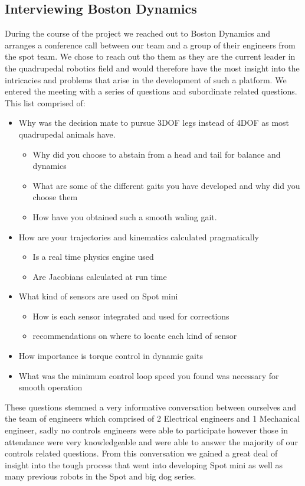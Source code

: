     \subsection{Interviewing Boston Dynamics}
        During the course of the project we reached out to Boston Dynamics and arranges a conference call between our team and a group of their engineers from the spot team. We chose to reach out tho them as they are the current leader in the quadrupedal robotics field and would therefore have the most insight into the intricacies and problems that arise in the development of such a platform. We entered the meeting with a series of questions and subordinate related questions. This list comprised of:
        \begin{itemize}
            \item Why was the decision mate to pursue 3DOF legs instead of 4DOF as most quadrupedal animals have. 
            \begin{itemize}
                \item Why did you choose to abstain from a head and tail for balance and dynamics
                \item What are some of the different gaits you have developed and why did you choose them
                \item How have you obtained such a smooth waling gait.
            \end{itemize}
            \item How are your trajectories and kinematics calculated pragmatically
                \begin{itemize}
                    \item Is a real time physics engine used
                    \item Are Jacobians calculated at run time
                \end{itemize}
            \item What kind of sensors are used on Spot mini
                \begin{itemize}
                    \item How is each sensor integrated and used for corrections
                    \item recommendations on where to locate each kind of sensor
                \end{itemize}
            \item How importance is torque control in dynamic gaits
            \item What was the minimum control loop speed you found was necessary for smooth operation
        \end{itemize}
        These questions stemmed a very informative conversation between ourselves and the team of engineers which comprised of 2 Electrical engineers and 1 Mechanical engineer, sadly no controls engineers were able to participate however those in attendance were very knowledgeable and were able to answer the majority of our controls related questions. From this conversation we gained a great deal of insight into the tough process that went into developing Spot mini as well as many previous robots in the Spot and big dog series. 

